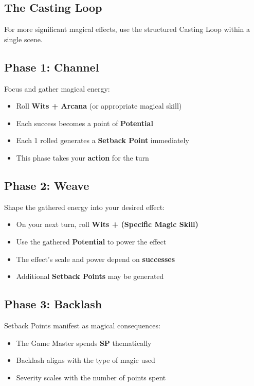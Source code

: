 \begin{multicols}{2}
\section{The Casting Loop} 

For more significant magical effects, use the structured Casting Loop within a single scene.

\subsection*{Phase 1: Channel} 
Focus and gather magical energy:
\begin{itemize}
\item Roll \textbf{Wits + Arcana} (or appropriate magical skill)
\item Each success becomes a point of \textbf{Potential}
\item Each 1 rolled generates a \textbf{Setback Point} immediately
\item This phase takes your \textbf{action} for the turn
\end{itemize}

\subsection*{Phase 2: Weave} 
Shape the gathered energy into your desired effect:
\begin{itemize}
\item On your next turn, roll \textbf{Wits + (Specific Magic Skill)}
\item Use the gathered \textbf{Potential} to power the effect
\item The effect's scale and power depend on \textbf{successes}
\item Additional \textbf{Setback Points} may be generated
\end{itemize}

\subsection*{Phase 3: Backlash} 
Setback Points manifest as magical consequences:
\begin{itemize}
\item The Game Master spends \textbf{SP} thematically
\item Backlash aligns with the type of magic used
\item Severity scales with the number of points spent
\end{itemize}


\end{multicols}

